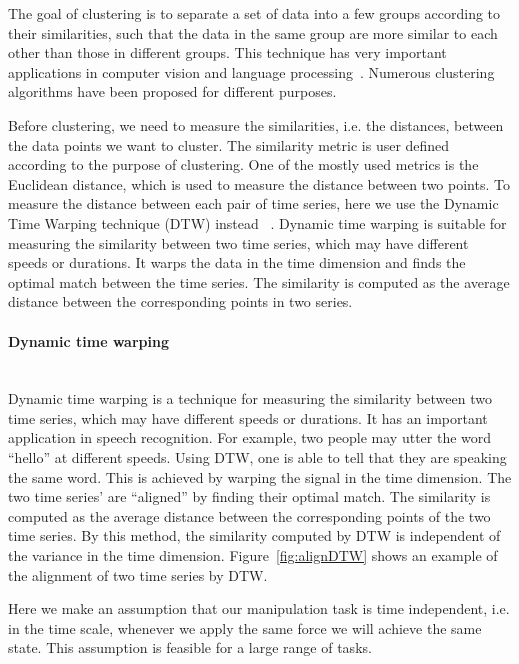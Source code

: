 The goal of clustering is to separate a set of data into a few groups according to their similarities, such that the data in the same group are more similar to each other than those in different groups. This technique has very important applications in computer vision and language processing~\cite{warren2005clustering}. Numerous clustering algorithms have been proposed for different purposes.

Before clustering, we need to measure the similarities, i.e. the distances, between the data points we want to cluster. The similarity metric is user defined according to the purpose of clustering. One of the mostly used metrics is the Euclidean distance, which is used to measure the distance between two points. To measure the distance between each pair of time series, here we use the Dynamic Time Warping technique (DTW) instead ~\citep{berndt1994using}.
Dynamic time warping is suitable for measuring the similarity between two time series, which may have different speeds or durations. It warps the data in the time dimension and finds the optimal match between the time series. The similarity is computed as the average distance between the corresponding points in two series.


\paragraph{Dynamic time warping} ~\\
Dynamic time warping is a technique for measuring the similarity between two time series, which may have different speeds or durations. It has an important application in speech recognition. For example, two people may utter the word ``hello'' at different speeds. Using DTW, one is able to tell that they are speaking the same word. This is achieved by warping the signal in the time dimension. The two time series' are ``aligned'' by finding their optimal match. The similarity is computed as the average distance between the corresponding points of the two time series. By this method, the similarity computed by DTW is independent of the variance in the time dimension. Figure~\ref{fig:alignDTW} shows an example of the alignment of two time series by DTW.

Here we make an assumption that our manipulation task is time independent, i.e. in the time scale, whenever we apply the same force we will achieve the same state. This assumption is feasible for a large range of tasks.


